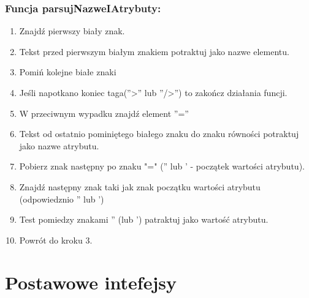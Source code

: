 \documentclass{article}
\begin{document}
\subsubsection*{Funcja parsujNazweIAtrybuty:}
\begin{enumerate}
	\item Znajdź pierwszy biały znak.
	\item Tekst przed pierwszym białym znakiem potraktuj jako nazwe elementu.
	\item Pomiń kolejne białe znaki
	\item Jeśli napotkano koniec taga(''>'' lub ''/>'') to zakończ działania funcji.
	\item W przeciwnym wypadku znajdź element ''=''
	\item Tekst od ostatnio pominiętego białego znaku do znaku równości potraktuj jako nazwe atrybutu.
	\item Pobierz znak następny po znaku "=" ('' lub ' - początek wartości atrybutu).
	\item Znajdź następny znak taki jak znak początku wartości atrybutu (odpowiedznio '' lub ')
	\item Test pomiedzy znakami '' (lub ') patraktuj jako wartość atrybutu.
	\item Powrót do kroku 3.
\end{enumerate}

\section{Postawowe intefejsy}


\end{document}
